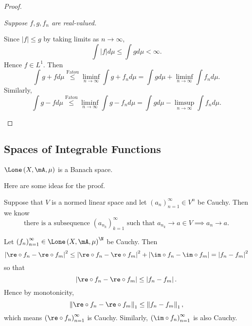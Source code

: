 \documentclass[pmath451]{subfiles}
\begin{document}
    \begin{proof}
        \begin{case}
            \textit{Suppose $f,g,f_n$ are real-valued.}

            Since $\left| f \right|\leq g$ by taking limits as $n\to\infty$,
            \begin{equation*}
                \int\left| f \right|d\mu\leq\int gd\mu < \infty.
            \end{equation*}
            Hence $f\in L^1$. Then
            \begin{equation*}
                \int g+fd\mu \overset{\text{Fatou}}{\leq} \liminf_{n\to\infty}\int g+f_nd\mu = \int gd\mu + \liminf_{n\to\infty}\int f_nd\mu.
            \end{equation*}
            Similarly,
            \begin{equation*}
                \int g-fd\mu \overset{\text{Fatou}}{\leq} \liminf_{n\to\infty}\int g-f_nd\mu = \int gd\mu - \limsup_{n\to\infty}\int f_nd\mu.
            \end{equation*}
        \end{case}
    \end{proof}

    \subsection{Spaces of Integrable Functions}

    \begin{prop}{}
        $\Lone\left( X,\mA,\mu \right)$ is a Banach space.
    \end{prop}

    \rruleline

    \np Here are some ideas for the proof.

    Suppose that $V$ is a normed linear space and let $\left( a_{n} \right)^{\infty}_{n=1}\in V^n$ be Cauchy. Then we know
    \begin{equation*}
        \text{there is a subsequence $\left( a_{n_k} \right)^{\infty}_{k=1}$ such that }a_{n_k}\to a\in V \implies a_n\to a.
    \end{equation*}
    
    Let $\left( f_{n} \right)^{\infty}_{n=1}\in \Lone\left( X,\mA,\mu \right)^{\N}$ be Cauchy. Then
    \begin{equation*}
        \left| \re\circ f_n - \re\circ f_m \right|^{2} \leq \left| \re\circ f_n-\re\circ f_m \right|^{2} + \left| \im\circ f_n-\im\circ f_m \right| = \left| f_n-f_m \right|^{2}
    \end{equation*}
    so that
    \begin{equation*}
        \left| \re\circ f_n-\re\circ f_m \right| \leq \left| f_n-f_m \right|.
    \end{equation*}
    Hence by monotonicity,
    \begin{equation*}
        \left\lVert \re\circ f_n-\re\circ f_m \right\rVert_{1} \leq \left\lVert f_n-f_m \right\rVert_{1},
    \end{equation*}
    which means $\left( \re\circ f_{n} \right)^{\infty}_{n=1}$ is Cauchy. Similarly, $\left( \im\circ f_{n} \right)^{\infty}_{n=1}$ is also Cauchy.
    
\end{document}
